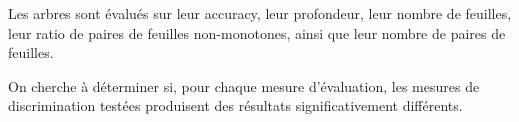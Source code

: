 \documentclass[a4paper]{article}
\begin{document}
Les arbres sont évalués sur leur accuracy, leur profondeur, leur nombre de
feuilles, leur ratio de paires de feuilles non-monotones, ainsi que leur nombre
de paires de feuilles.

On cherche à déterminer si, pour chaque mesure d'évaluation, les mesures de
discrimination testées produisent des résultats significativement différents. \\

\begin{table}
\caption{Description des bases de classification}
\label{tab:descr-classification}
\end{table}
\end{document}
